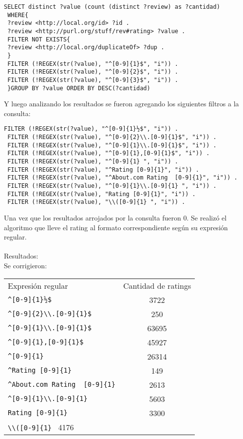  \begin{lstlisting}[frame=single]
 SELECT distinct ?value (count (distinct ?review) as ?cantidad)
 WHERE{ 
 ?review <http://local.org/id> ?id .
 ?review <http://purl.org/stuff/rev#rating> ?value .
 FILTER NOT EXISTS{
 ?review <http://local.org/duplicateOf> ?dup .
 }
 FILTER (!REGEX(str(?value), "^[0-9]{1}$", "i")) .
 FILTER (!REGEX(str(?value), "^[0-9]{2}$", "i")) .
 FILTER (!REGEX(str(?value), "^[0-9]{3}$", "i")) .
 }GROUP BY ?value ORDER BY DESC(?cantidad)
 \end{lstlisting}
 Y luego analizando los resultados se fueron agregando los siguientes filtros a la consulta:\\
 \begin{lstlisting}[frame=single]
 FILTER (!REGEX(str(?value), "^[0-9]{1}½$", "i")) . 
 FILTER (!REGEX(str(?value), "^[0-9]{2}\\.[0-9]{1}$", "i")) .
 FILTER (!REGEX(str(?value), "^[0-9]{1}\\.[0-9]{1}$", "i")) . 
 FILTER (!REGEX(str(?value), "^[0-9]{1},[0-9]{1}$", "i")) .
 FILTER (!REGEX(str(?value), "^[0-9]{1} ", "i")) .  
 FILTER (!REGEX(str(?value), "^Rating [0-9]{1}", "i")) .  
 FILTER (!REGEX(str(?value), "^About.com Rating  [0-9]{1}", "i")) . 
 FILTER (!REGEX(str(?value), "^[0-9]{1}\\.[0-9]{1} ", "i")) .  
 FILTER (!REGEX(str(?value), "Rating [0-9]{1}", "i")) .
 FILTER (!REGEX(str(?value), "\\([0-9]{1} ", "i")) .
 \end{lstlisting}
 Una vez que los resultados arrojados por la consulta fueron 0. Se realizó el algoritmo que lleve el rating al formato correspondiente 
 según su expresión regular.\\
 \\
 Resultados:\\
 Se corrigieron:
 \begin{tabular}{| l | c |}
 Expresión regular & Cantidad de ratings \\
 \verb|^[0-9]{1}½$| & 3722\\
 \verb|^[0-9]{2}\\.[0-9]{1}$| & 250\\
 \verb|^[0-9]{1}\\.[0-9]{1}$| & 63695\\
 \verb|^[0-9]{1},[0-9]{1}$| & 45927\\
 \verb|^[0-9]{1} | & 26314\\
 \verb|^Rating [0-9]{1}| & 149\\
 \verb|^About.com Rating  [0-9]{1}| & 2613\\
 \verb|^[0-9]{1}\\.[0-9]{1} | & 5603\\
 \verb|Rating [0-9]{1}| & 3300\\
 \verb|\\([0-9]{1} | 4176& 
 \end{tabular}